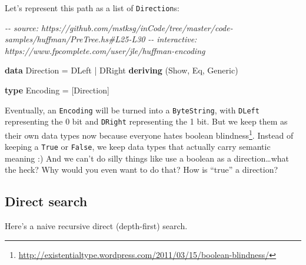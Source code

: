 \documentclass[]{article}
\newenvironment{Shaded}{}{}
\newcommand{\CommentTok}[1]{\textcolor[rgb]{0.38,0.63,0.69}{\textit{#1}}}
\newcommand{\DataTypeTok}[1]{\textcolor[rgb]{0.56,0.13,0.00}{#1}}
\newcommand{\KeywordTok}[1]{\textcolor[rgb]{0.00,0.44,0.13}{\textbf{#1}}}
\newcommand{\NormalTok}[1]{#1}
\newcommand{\OperatorTok}[1]{\textcolor[rgb]{0.40,0.40,0.40}{#1}}
\newcommand{\OtherTok}[1]{\textcolor[rgb]{0.00,0.44,0.13}{#1}}
\renewcommand{\href}[2]{#2\footnote{\url{#1}}}
\begin{document}
Let's represent this path as a list of \texttt{Direction}s:

\begin{Shaded}
\begin{Highlighting}[]
\CommentTok{{-}{-} source: https://github.com/mstksg/inCode/tree/master/code{-}samples/huffman/PreTree.hs\#L25{-}L30}
\CommentTok{{-}{-} interactive: https://www.fpcomplete.com/user/jle/huffman{-}encoding}

\KeywordTok{data} \DataTypeTok{Direction} \OtherTok{=} \DataTypeTok{DLeft}
               \OperatorTok{|} \DataTypeTok{DRight}
               \KeywordTok{deriving}\NormalTok{ (}\DataTypeTok{Show}\NormalTok{, }\DataTypeTok{Eq}\NormalTok{, }\DataTypeTok{Generic}\NormalTok{)}

\KeywordTok{type} \DataTypeTok{Encoding} \OtherTok{=}\NormalTok{ [}\DataTypeTok{Direction}\NormalTok{]}
\end{Highlighting}
\end{Shaded}

Eventually, an \texttt{Encoding} will be turned into a \texttt{ByteString}, with
\texttt{DLeft} representing the 0 bit and \texttt{DRight} representing the 1
bit. But we keep them as their own data types now because everyone hates
\href{http://existentialtype.wordpress.com/2011/03/15/boolean-blindness/}{boolean
blindness}. Instead of keeping a \texttt{True} or \texttt{False}, we keep data
types that actually carry semantic meaning :) And we can't do silly things like
use a boolean as a direction\ldots what the heck? Why would you even want to do
that? How is ``true'' a direction?

\subsection{Direct search}\label{direct-search}

Here's a naive recursive direct (depth-first) search.
\end{document}
